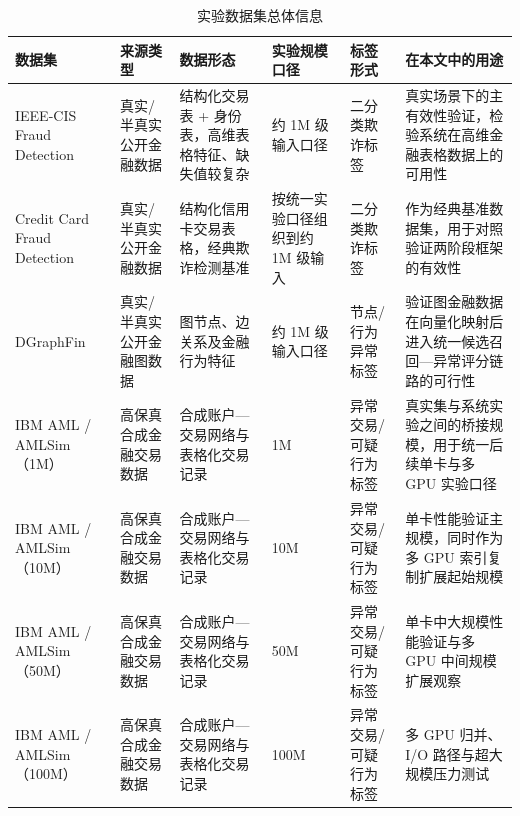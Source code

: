 \begin{table}[htbp]
  \caption{实验数据集总体信息}
  \label{tab:datasets-overall}
  \centering
  \small
  \renewcommand{\arraystretch}{1.2}
  \begin{adjustbox}{max width=\linewidth}
  \begin{tabular}{P{2.8cm}P{2.6cm}P{4.0cm}P{2.3cm}P{2.6cm}P{4.1cm}}
    \toprule
    数据集 & 来源类型 & 数据形态 & 实验规模口径 & 标签形式 & 在本文中的用途\\
    \midrule
    IEEE-CIS Fraud Detection & 真实/半真实公开金融数据 & 结构化交易表 + 身份表，高维表格特征、缺失值较复杂 & 约 1M 级输入口径 & 二分类欺诈标签 & 真实场景下的主有效性验证，检验系统在高维金融表格数据上的可用性\\
    Credit Card Fraud Detection & 真实/半真实公开金融数据 & 结构化信用卡交易表格，经典欺诈检测基准 & 按统一实验口径组织到约 1M 级输入 & 二分类欺诈标签 & 作为经典基准数据集，用于对照验证两阶段框架的有效性\\
    DGraphFin & 真实/半真实公开金融图数据 & 图节点、边关系及金融行为特征 & 约 1M 级输入口径 & 节点/行为异常标签 & 验证图金融数据在向量化映射后进入统一候选召回---异常评分链路的可行性\\
    IBM AML / AMLSim（1M） & 高保真合成金融交易数据 & 合成账户---交易网络与表格化交易记录 & 1M & 异常交易/可疑行为标签 & 真实集与系统实验之间的桥接规模，用于统一后续单卡与多 GPU 实验口径\\
    IBM AML / AMLSim（10M） & 高保真合成金融交易数据 & 合成账户---交易网络与表格化交易记录 & 10M & 异常交易/可疑行为标签 & 单卡性能验证主规模，同时作为多 GPU 索引复制扩展起始规模\\
    IBM AML / AMLSim（50M） & 高保真合成金融交易数据 & 合成账户---交易网络与表格化交易记录 & 50M & 异常交易/可疑行为标签 & 单卡中大规模性能验证与多 GPU 中间规模扩展观察\\
    IBM AML / AMLSim（100M） & 高保真合成金融交易数据 & 合成账户---交易网络与表格化交易记录 & 100M & 异常交易/可疑行为标签 & 多 GPU 归并、I/O 路径与超大规模压力测试\\
    \bottomrule
  \end{tabular}
  \end{adjustbox}
\end{table}

